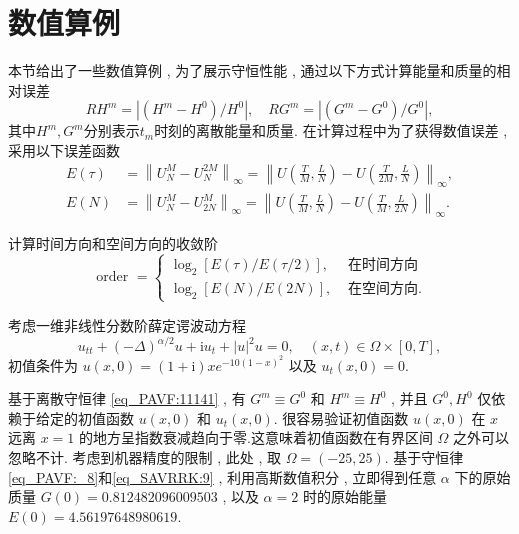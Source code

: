 \section{数值算例}\label{Section_PAVF: 4}

本节给出了一些数值算例 , 为了展示守恒性能 , 通过以下方式计算能量和质量的相对误差
\begin{equation}\label{eq_PAVF:105}
R H^{m}=\left|\left(H^{m}-H^{0}\right) / H^{0}\right| , \quad R G^{m}=\left|\left(G^{m}-G^{0}\right) / G^{0}\right| , 
\end{equation}
其中$H^{m} , G^{m}$分别表示$t_{m}$时刻的离散能量和质量.
在计算过程中为了获得数值误差 , 采用以下误差函数
\begin{align}\label{eq_PAVF:103}
E(\tau)&=\left\|U_{N}^{M}-U_{N}^{2 M}\right\|_{\infty}=\left\|U\left(\frac{T}{M} , \frac{L}{N}\right)-U\left(\frac{T}{2 M} , \frac{L}{N}\right)\right\|_{\infty} , \nonumber\\
E(N)&=\left\|U_{N}^{M}-U_{2 N}^{M}\right\|_{\infty}=\left\|U\left(\frac{T}{M} , \frac{L}{N}\right)-U\left(\frac{T}{M} , \frac{L}{2 N}\right)\right\|_{\infty}.
\end{align}

计算时间方向和空间方向的收敛阶
\begin{equation}
\text { order }= \left\{
\begin{aligned}
\log _{2}[E(\tau) / E(\tau / 2)] , & \text { 在时间方向 } \\
\log _{2}[E(N) / E(2 N)] , & \text { 在空间方向.}
\end{aligned}\right.\label{eq_PAVF:104}
\end{equation}

\begin{example}\label{exp_PAVF:2}
	考虑一维非线性分数阶薛定谔波动方程
	\begin{equation}\label{eq_PAVF:108}
	u_{t t}+(-\Delta)^{\alpha / 2} u+\mathrm{i}u_t+|u|^2 u=0 , \quad (x , t)\in  \Omega\times[0 , T] , 
	\end{equation}
	初值条件为 $u(x , 0)=(1+\mathrm{i}) x e^{-10(1-x)^2}$ 以及 $u_t(x , 0)=0$.
\end{example}

	基于离散守恒律 \eqref{eq_PAVF:11141} , 有 $G^{m}\equiv G^0$ 和 $H^{m}\equiv H^0$ , 并且 $G^0 , H^0$ 仅依赖于给定的初值函数 $u(x , 0)$ 和 $u_t(x , 0)$.
	很容易验证初值函数 $u(x , 0)$ 在 $x$ 远离 $x=1$ 的地方呈指数衰减趋向于零.这意味着初值函数在有界区间 $\Omega$ 之外可以忽略不计.
	考虑到机器精度的限制 , 此处 , 取 $\Omega=(-25 , 25)$.
	基于守恒律 \eqref{eq_PAVF:_8}和\eqref{eq_SAVRRK:9} , 利用高斯数值积分 , 立即得到任意 $\alpha$ 下的原始质量 $G(0)=0.812482096009503$ , 以及 $\alpha=2$ 时的原始能量 $E(0)=4.56197648980619$.


